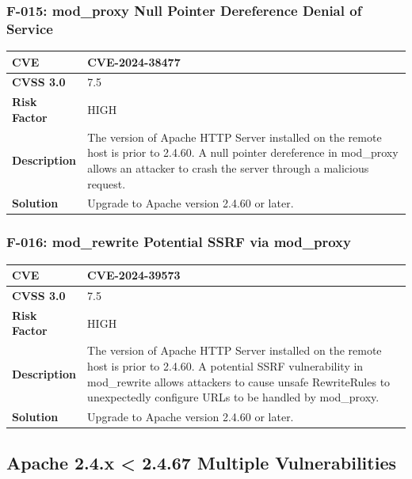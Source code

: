 \subsubsection{F-015: mod\_proxy Null Pointer Dereference Denial of Service}
\begin{tabular}{|p{2.8cm}|p{12.2cm}|}
\hline
\textbf{CVE} & CVE-2024-38477 \\ \hline
\textbf{CVSS 3.0} & 7.5 \\ \hline
\textbf{Risk Factor} & HIGH \\ \hline
\textbf{Description} & The version of Apache HTTP Server installed on the remote host is prior to 2.4.60. A null pointer dereference in mod\_proxy allows an attacker to crash the server through a malicious request. \\ \hline
\textbf{Solution} & Upgrade to Apache version 2.4.60 or later. \\ \hline
\end{tabular}

\subsubsection{F-016: mod\_rewrite Potential SSRF via mod\_proxy}
\begin{tabular}{|p{2.8cm}|p{12.2cm}|}
\hline
\textbf{CVE} & CVE-2024-39573 \\ \hline
\textbf{CVSS 3.0} & 7.5 \\ \hline
\textbf{Risk Factor} & HIGH \\ \hline
\textbf{Description} & The version of Apache HTTP Server installed on the remote host is prior to 2.4.60. A potential SSRF vulnerability in mod\_rewrite allows attackers to cause unsafe RewriteRules to unexpectedly configure URLs to be handled by mod\_proxy. \\ \hline
\textbf{Solution} & Upgrade to Apache version 2.4.60 or later. \\ \hline
\end{tabular}

%
%
\subsection{Apache 2.4.x < 2.4.67 Multiple Vulnerabilities}

